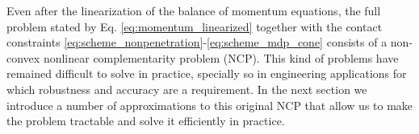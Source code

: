 Even after the linearization of the balance of momentum equations, the full
problem stated by Eq. \eqref{eq:momentum_linearized} together with the contact
constraints \eqref{eq:scheme_nonpenetration}-\eqref{eq:scheme_mdp_cone} consists
of a non-convex nonlinear complementarity problem (NCP). This kind of problems
have remained difficult to solve in practice, specially so in engineering
applications for which robustness and accuracy are a requirement. In the next
section we introduce a number of approximations to this original NCP that allow
us to make the problem tractable and solve it efficiently in practice.
